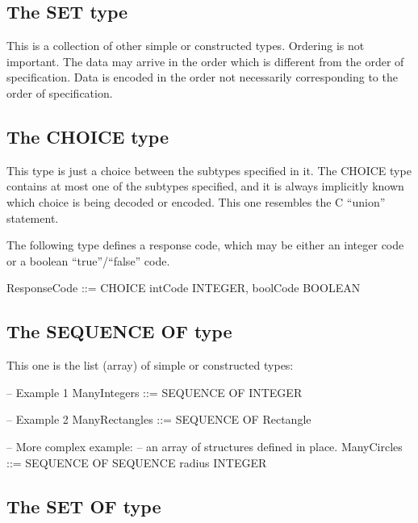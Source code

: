 \documentclass[english,oneside,12pt]{book}
\begin{document}
\subsection{The SET type}

This is a collection of other simple or constructed types. Ordering
is not important. The data may arrive in the order which is different
from the order of specification. Data is encoded in the order not
necessarily corresponding to the order of specification.


\subsection{The CHOICE type}

This type is just a choice between the subtypes specified in it. The
CHOICE type contains at most one of the subtypes specified, and it
is always implicitly known which choice is being decoded or encoded.
This one resembles the C ``union'' statement.

The following type defines a response code, which may be either an
integer code or a boolean ``true''/``false'' code.
\begin{asn}
ResponseCode ::= CHOICE {
    intCode    INTEGER,
    boolCode   BOOLEAN
}
\end{asn}

\subsection{The SEQUENCE OF type}

This one is the list (array) of simple or constructed types:
\begin{asn}
-- Example 1
ManyIntegers ::= SEQUENCE OF INTEGER

-- Example 2
ManyRectangles ::= SEQUENCE OF Rectangle

-- More complex example:
-- an array of structures defined in place.
ManyCircles ::= SEQUENCE OF SEQUENCE {
                            radius INTEGER
                            }
\end{asn}

\subsection{The SET OF type}
\end{document}

